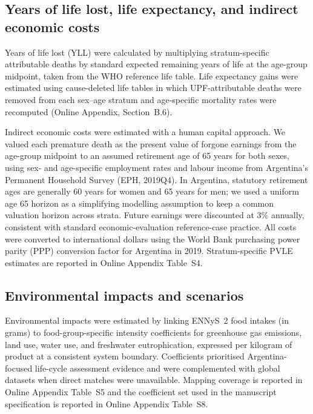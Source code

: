﻿\documentclass{article}
\begin{document}
\subsection{Years of life lost, life expectancy, and indirect economic costs}

Years of life lost (YLL) were calculated by multiplying stratum-specific attributable deaths by standard expected remaining years of life at the age-group midpoint, taken from the WHO reference life table.\cite{WHO2024DALY} Life expectancy gains were estimated using cause-deleted life tables in which UPF-attributable deaths were removed from each sex--age stratum and age-specific mortality rates were recomputed (Online Appendix, Section~B.6).

Indirect economic costs were estimated with a human capital approach. We valued each premature death as the present value of forgone earnings from the age-group midpoint to an assumed retirement age of 65 years for both sexes, using sex- and age-specific employment rates and labour income from Argentina's Permanent Household Survey (EPH, 2019Q4).\cite{INDECEPH2019Q4,INDECMercadoTrabajo2020} In Argentina, statutory retirement ages are generally 60 years for women and 65 years for men; we used a uniform age 65 horizon as a simplifying modelling assumption to keep a common valuation horizon across strata.\cite{ANSESJubilacionOrdinaria2026} Future earnings were discounted at 3\% annually, consistent with standard economic-evaluation reference-case practice.\cite{iDSIReferenceCase2014,Sanders2016SecondPanel} All costs were converted to international dollars using the World Bank purchasing power parity (PPP) conversion factor for Argentina in 2019.\cite{WorldBankPPP2019} Stratum-specific PVLE estimates are reported in Online Appendix Table~S4.

\subsection{Environmental impacts and scenarios}

Environmental impacts were estimated by linking ENNyS~2 food intakes (in grams) to food-group-specific intensity coefficients for greenhouse gas emissions, land use, water use, and freshwater eutrophication, expressed per kilogram of product at a consistent system boundary. Coefficients prioritised Argentina-focused life-cycle assessment evidence\cite{Arrieta2018,Arrieta2021,Arrieta2022SustainSci} and were complemented with global datasets when direct matches were unavailable.\cite{PooreNemecek2018,OWIDDatasets2026,ADEMEAgribalyse2026} Mapping coverage is reported in Online Appendix Table~S5 and the coefficient set used in the manuscript specification is reported in Online Appendix Table~S8.
\end{document}
